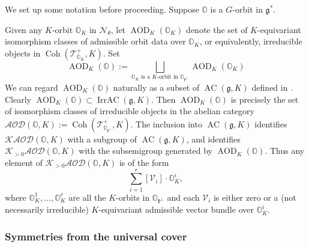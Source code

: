 \documentclass[11pt, a4paper]{amsart}
\newcommand{\g}{\mathfrak{g}}
\newcommand{\orb}{\mathbb{O}}
\newcommand{\orbk}{\orb_{K}}
\newcommand{\fg}{\mathfrak{g}}
\newcommand{\fk}{\mathfrak{k}}
\newcommand{\cK}{\mathcal{K}}
\newcommand{\cN}{\mathcal{N}}
\newcommand{\cV}{\mathcal{V}}
\DeclareMathOperator{\AC}{AC}
\DeclareMathOperator{\AOD}{AOD}
\DeclareMathOperator{\IrrAC}{IrrAC}
\DeclareMathOperator{\Coh}{Coh}
\newcommand{\AODK}{\AOD_K}
\newcommand{\cAOD}{\mathcal{AOD}}
\newcommand{\TT}{\mathscr{T}}
\theoremstyle{definition}
\numberwithin{equation}{section}
\begin{document}
We set up some notation before proceeding.
Suppose $\orb$ is a $G$-orbit in $\fg^*$. 

Given any $K$-orbit $\orbk$ in $\cN_\theta$, let $\AODK(\orbk)$ denote the set of $K$-equivariant isomorphism classes of admissible orbit data over $\orbk$, or equivalently, irreducible objects in $\Coh(\TT^+_{\orbk}, K)$.
Set
\begin{equation}\label{eq:AODO}
	\AODK(\orb):=\bigsqcup_{\orbk \textrm{ is a $K$-orbit in $\orb_{\fk^\perp}$}} \AODK(\orbk)%
\end{equation}
We can regard $\AODK(\orb)$ naturally as a subset of $\AC(\g,K)$ defined in . Clearly $\AODK(\orb) \subset \IrrAC(\g,K)$. 
Then $\AODK(\orb)$ is precisely the set of isomorphism classes of irreducible objects in the abelian category $\cAOD(\orb, K) := \Coh(\TT^+_{\orb_{\fk^\perp}}, K)$. The inclusion into $\AC(\g,K)$ identifies $\cK\cAOD(\orb, K)$ with a subgroup of $\AC(\g,K)$, and identifies $\cK_{>0}\cAOD(\orb, K)$ with the subsemigroup generated by $\AODK(\orb)$. Thus any element of $\cK_{>0}\cAOD(\orb, K)$ is of the form
\[ \sum_{i=1}^r [\cV_i] \cdot \orbk^i, \]
where $\orbk^1, \ldots, \orbk^r$ are all the $K$-orbits in $\orb_{\fk^\perp}$ and each $\cV_i$ is either zero or a (not necessarily irreducible) $K$-equivariant admissible vector bundle over $\orbk^i$.

\subsubsection{Symmetries from the universal cover} \label{subsubsec:tilde_Gamma_K}
\end{document}
